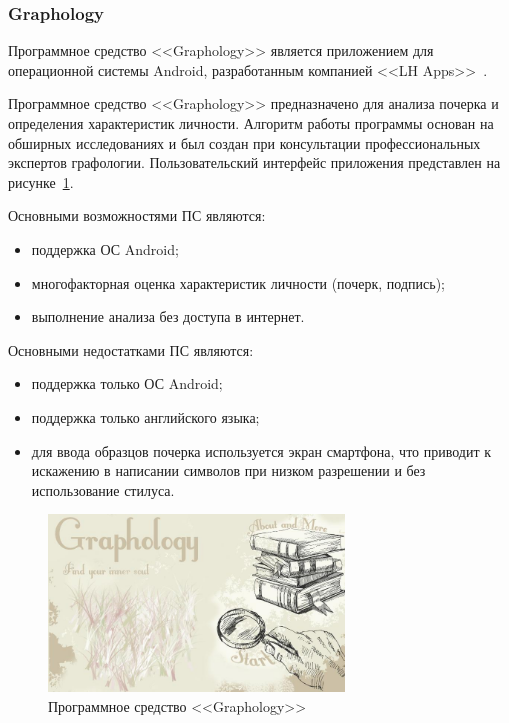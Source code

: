 \subsubsection{Graphology}
\label{sub:domain:analogs:graphology}
Программное средство <<Graphology>> является приложением для операционной системы Android, разработанным компанией <<LH Apps>>~\cite{analogs_graphology}.

Программное средство <<Graphology>> предназначено для анализа почерка и определения характеристик личности. Алгоритм работы программы основан на обширных исследованиях и был создан при консультации профессиональных экспертов графологии. Пользовательский интерфейс приложения представлен на рисунке~\ref{fig:domain:analogs:graphology}.

Основными возможностями ПС являются:
\begin{itemize}
  \item поддержка ОС Android;
  \item многофакторная оценка характеристик личности (почерк, подпись);
  \item выполнение анализа без доступа в интернет.
\end{itemize}

Основными недостатками ПС являются:
\begin{itemize}
  \item поддержка только ОС Android;
  \item поддержка только английского языка;
  \item для ввода образцов почерка используется экран смартфона, что приводит к искажению в написании символов при низком разрешении и без использование стилуса.
\end{itemize}

\begin{figure}[ht]
    \centering
    \includegraphics[width=0.7\textwidth]{figures/graphology_analog.jpeg}
    \caption{Программное средство <<Graphology>>}
    \label{fig:domain:analogs:graphology}
\end{figure}

